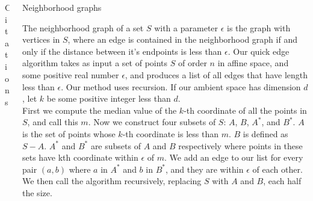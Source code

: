 \documentclass{beamer}
\begin{document}
\begin{frame}{}
\begin{columns}[t]
\begin{column}{0.32\linewidth}
\begin{block}{Citations}

\end{block}



\end{column}%

\begin{column}{0.32\linewidth}

\begin{block}{Neighborhood graphs}

The neighborhood graph of a set $S$ with a parameter $\epsilon$ is the graph
with vertices in $S$, where an edge is contained in the neighborhood graph if
and only if the distance between it's endpoints is less than $\epsilon$. Our
quick edge algorithm takes as input a set of points $S$ of order $n$ in affine
space, and some positive real number $\epsilon$, and produces a list of all edges that have length less than $\epsilon$. Our method uses recursion. If our ambient space has dimension $d$, let $k$ be some positive integer less than $d$. 
\\

First we compute the median value of the $k$-th coordinate of all the points in $S$, and call this $m$. Now we construct four subsets of $S$: $A$, $B$, $A^*$, and $B^*$. $A$ is the set of points whose $k$-th coordinate is less than $m$. $B$ is defined as $S-A$. $A^*$ and $B^*$ are subsets of $A$ and $B$ respectively where points in these sets have kth coordinate within $\epsilon$ of $m$. We add an edge to our list for every pair $(a,b)$ where $a$ in $A^*$ and $b$ in $B^*$, and they are within $\epsilon$ of each other. We then call the algorithm recursively, replacing $S$ with $A$ and $B$, each half the size.


\end{block}
\end{column}
\end{columns}
\end{frame}
\end{document}
